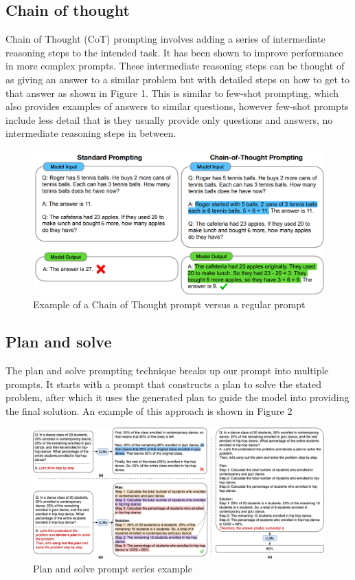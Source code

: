 \documentclass[fleqn,moreauthors,10pt]{ds_report}
\begin{document}
\subsection*{Chain of thought}
Chain of Thought (CoT) \cite{CoT} prompting involves adding a series of intermediate reasoning steps to the intended task. It has been shown to improve performance in more complex prompts.
These intermediate reasoning steps can be thought of as giving an answer to a similar problem but with detailed steps on how to get to that answer as shown in Figure 1. This is similar to few-shot prompting, which also provides examples of answers to similar questions, however few-shot prompts include less detail that is they usually provide only questions and answers, no intermediate reasoning steps in between. \cite{CoT}

\begin{figure}[!h]\centering
	\includegraphics[width=\linewidth]{Example_CoT.png}
	\caption{Example of a Chain of Thought prompt versus a regular prompt}
	\label{fig:column}
\end{figure}

\subsection*{Plan and solve}
The plan and solve \cite{plansolve} prompting technique breaks up our prompt into multiple prompts. It starts with a prompt that constructs a plan to solve the stated problem, after which it uses the generated plan to guide the model into providing the final solution. An example of this approach is shown in Figure 2

\begin{figure}[!h]
    \centering
    \includegraphics[width=\linewidth]{fig/image.png}
    \caption{Plan and solve prompt series example}
    \label{fig:colum}
\end{figure}
\end{document}
